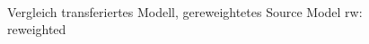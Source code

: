 \begin{figure}[tbp]
	\centering
	 \\
	\caption{Vergleich transferiertes Modell, gereweightetes Source Model \newline
		rw: reweighted}
	\label{34,35,24,reweight}
\end{figure}
